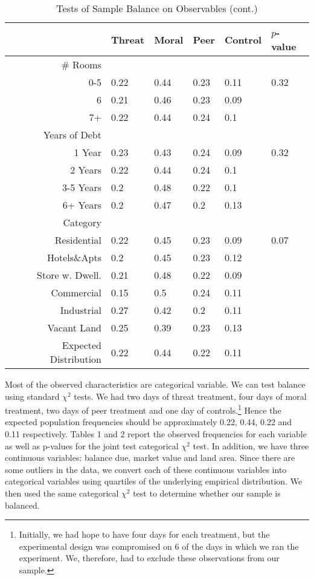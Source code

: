 \documentclass[12pt,titlepage]{article}
\begin{document}
\begin{table}[htbp]
\caption{Tests of Sample Balance on Observables (cont.)}  \label{table:balanceII}
\centering
\begin{tabular}{rlllll}
\hline
  & Threat & Moral & Peer & Control & $p$-value \\ 
  \hline
 \# Rooms &  &  &  &  &  \\ 
  0-5 & 0.22 & 0.44 & 0.23 & 0.11 & 0.32 \\ 
  6 & 0.21 & 0.46 & 0.23 & 0.09 &  \\ 
  7+ & 0.22 & 0.44 & 0.24 & 0.1 &  \\ 
   \hline
Years of Debt &  &  &  &  &  \\ 
  1 Year & 0.23 & 0.43 & 0.24 & 0.09 & 0.32 \\ 
  2 Years & 0.22 & 0.44 & 0.24 & 0.1 &  \\ 
  3-5 Years & 0.2 & 0.48 & 0.22 & 0.1 &  \\ 
  6+ Years & 0.2 & 0.47 & 0.2 & 0.13 &  \\ 
   \hline
Category &  &  &  &  &  \\ 
  Residential & 0.22 & 0.45 & 0.23 & 0.09 & 0.07 \\ 
  Hotels\&Apts & 0.2 & 0.45 & 0.23 & 0.12 &  \\ 
  Store w. Dwell. & 0.21 & 0.48 & 0.22 & 0.09 &  \\ 
  Commercial & 0.15 & 0.5 & 0.24 & 0.11 &  \\ 
  Industrial & 0.27 & 0.42 & 0.2 & 0.11 &  \\ 
  Vacant Land & 0.25 & 0.39 & 0.23 & 0.13 &  \\ 
   \hline
Expected Distribution & 0.22 & 0.44 & 0.22 & 0.11 &  \\ 
   \hline
\end{tabular}
\end{table}


Most of the observed characteristics are categorical variable. We can
test balance using standard $\chi^2$ tests. We had two days of threat
treatment, four days of moral treatment, two days of peer treatment
and one day of controls.\footnote{Initially, we had hope to have four
  days for each treatment, but the experimental design was compromised
  on 6 of the days in which we ran the experiment. We, therefore, had
  to exclude these observations from our sample.} Hence the expected
population frequencies should be approximately 0.22, 0.44, 0.22 and
0.11 respectively. Tables 1 and 2 report the observed
frequencies for each variable as well as p-values for the joint test
categorical $\chi^2$ test. In addition, we have three continuous
variables: balance due, market value and land area. Since there are
some outliers in the data, we convert each of these continuous
variables into categorical variables using quartiles of the underlying
empirical distribution. We then used the same categorical $\chi^2$
test to determine whether our sample is balanced.
\end{document}
